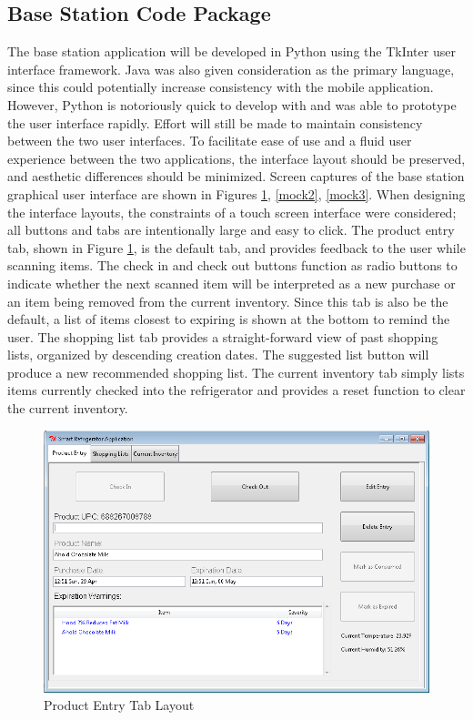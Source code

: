 \documentclass[11pt]{article} %
\begin{document}
\subsection{Base Station Code Package}
The base station application will be developed in Python using the TkInter user interface framework. Java was also given consideration as the primary language, since this could potentially increase consistency with the mobile application. However, Python is notoriously quick to develop with and was able to prototype the user interface rapidly. Effort will still be made to maintain consistency between the two user interfaces. To facilitate ease of use and a fluid user experience between the two applications, the interface layout should be preserved, and aesthetic differences should be minimized. Screen captures of the base station graphical user interface are shown in Figures \ref{mock1}, \ref{mock2}, \ref{mock3}. When designing the interface layouts, the constraints of a touch screen interface were considered; all buttons and tabs are intentionally large and easy to click. The product entry tab, shown in Figure \ref{mock1}, is the default tab, and provides feedback to the user while scanning items. The check in and check out buttons function as radio buttons to indicate whether the next scanned item will be interpreted as a new purchase or an item being removed from the current inventory. Since this tab is also be the default, a list of items closest to expiring is shown at the bottom to remind the user. The shopping list tab provides a straight-forward view of past shopping lists, organized by descending creation dates. The suggested list button will produce a new recommended shopping list. The current inventory tab simply lists items currently checked into the refrigerator and provides a reset function to clear the current inventory.
\pagebreak
\begin{figure}[h!]
\vspace{0.5cm}
\begin{center}
\includegraphics[scale=0.45]{../graphics/ProductEntry}
\caption{Product Entry Tab Layout}
\label{mock1}
\end{center}
\end{figure}
\end{document}
